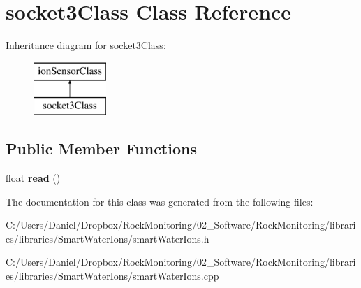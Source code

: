 \hypertarget{classsocket3_class}{}\section{socket3\+Class Class Reference}
\label{classsocket3_class}
Inheritance diagram for socket3\+Class\+:\begin{figure}[H]
\begin{center}
\leavevmode
\includegraphics[height=2.000000cm]{classsocket3_class}
\end{center}
\end{figure}
\subsection*{Public Member Functions}
\begin{DoxyCompactItemize}
\item 
float {\bfseries read} ()\hypertarget{classsocket3_class_ad22671e97bb8a9520ee9bed79d3ad483}{}\label{classsocket3_class_ad22671e97bb8a9520ee9bed79d3ad483}

\end{DoxyCompactItemize}


The documentation for this class was generated from the following files\+:\begin{DoxyCompactItemize}
\item 
C\+:/\+Users/\+Daniel/\+Dropbox/\+Rock\+Monitoring/02\+\_\+\+Software/\+Rock\+Monitoring/libraries/libraries/\+Smart\+Water\+Ions/smart\+Water\+Ions.\+h\item 
C\+:/\+Users/\+Daniel/\+Dropbox/\+Rock\+Monitoring/02\+\_\+\+Software/\+Rock\+Monitoring/libraries/libraries/\+Smart\+Water\+Ions/smart\+Water\+Ions.\+cpp\end{DoxyCompactItemize}
